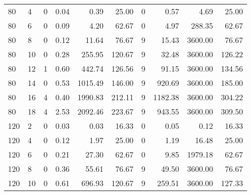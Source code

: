 \begin{appendices}
\begin{table*}[h]
\begin{center}
\begin{tabular} {l l | r r r r | r r r r}
 80 & 4                                  &   0             & 0.04          &  0.39       &  25.00       &  0           &  0.57     &  4.69       &  25.00           \\ 
 80 & 6                                  &   0             & 0.09          &  4.20       &  62.67       &  0           &  4.97     &  288.35     &  62.67           \\ 
 80 & 8                                  &   0             & 0.12          &  11.64      &  76.67       &  9           &  15.43    &  3600.00    &  76.67           \\ 
 80 & 10                                 &   0             & 0.28          &  255.95     &  120.67      &  9           &  32.48    &  3600.00    &  126.22          \\ 
 80 & 12                                 &   1             & 0.60          &  442.74     &  126.56      &  9           &  91.15    &  3600.00    &  134.56          \\ 
 80 & 14                                 &   0             & 0.53          &  1015.49    &  146.00      &  9           &  920.69   &  3600.00    &  185.00          \\ 
 80 & 16                                 &   4             & 0.40          &  1990.83    &  212.11      &  9           &  1182.38  &  3600.00    &  304.22          \\ 
 80 & 18                                 &   4             & 2.53          &  2092.46    &  223.67      &  9           &  943.55   &  3600.00    &  309.50          \\ 
 120 & 2                                 &   0             & 0.03          &  0.03       &  16.33       &  0           &  0.05     &  0.12       &  16.33           \\ 
 120 & 4                                 &   0             & 0.12          &  1.97       &  25.00       &  0           &  1.19     &  16.48      &  25.00           \\ 
 120 & 6                                 &   0             & 0.21          &  27.30      &  62.67       &  0           &  9.85     &  1979.18    &  62.67           \\ 
 120 & 8                                 &   0             & 0.36          &  55.61      &  76.67       &  9           &  49.50    &  3600.00    &  76.67           \\ 
 120 & 10                                &   0             & 0.61          &  696.93     &  120.67      &  9           &  259.51   &  3600.00    &  127.33          \\ 

\end{tabular}
\end{center}
\end{table*}
\end{appendices}
